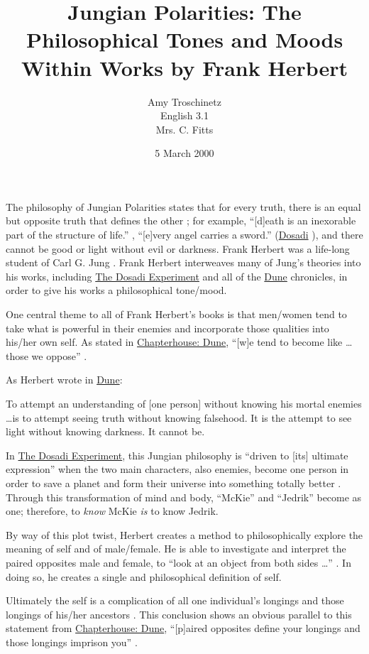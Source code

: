 \documentclass[14pt, a4paper, onecolumn]{extreport}
\date{5 March 2000}
\title{Jungian Polarities: The Philosophical Tones and Moods Within Works by Frank Herbert}
\author{Amy Troschinetz\\
	English 3.1\\
	Mrs. C. Fitts}
\begin{document}
\maketitle

The philosophy of Jungian Polarities states that for every truth, there is an equal but opposite truth that defines the other \cite{Hall:76}; for example, ``[d]eath is an inexorable part of the structure of life.'' \cite{McNelly}, ``[e]very angel carries a sword.'' (\underline{Dosadi} \cite{Dosadi:9}), and there cannot be good or light without evil or darkness. Frank Herbert was a life-long student of Carl G. Jung \cite{McNelly}. Frank Herbert interweaves many of Jung's theories into his works, including \underline{The Dosadi Experiment} and all of the \underline{Dune} chronicles, in order to give his works a philosophical tone/mood.

One central theme to all of Frank Herbert's books is that men/women tend to take what is powerful in their enemies and incorporate those qualities into his/her own self. As stated in \underline{Chapterhouse: Dune}, ``[w]e tend to become like \dots those we oppose'' \cite{Chapterhouse:23}.

As Herbert wrote in \underline{Dune}:

\begin{displayquote}
	To attempt an understanding of [one person] without knowing his mortal enemies \dots is to attempt seeing truth without knowing falsehood. It is the attempt to see light without knowing darkness. It cannot be. \cite{Dune:13}
\end{displayquote}

In \underline{The Dosadi Experiment}, this Jungian philosophy is ``driven to [its] ultimate expression'' when the two main characters, also enemies, become one person in order to save a planet and form their universe into something totally better \cite{Dosadi:270-271}. Through this transformation of mind and body, ``McKie'' and ``Jedrik'' become as one; therefore, to \emph{know} McKie \emph{is} to know Jedrik.

By way of this plot twist, Herbert creates a method to philosophically explore the meaning of self and of male/female. He is able to investigate and interpret the paired opposites male and female, to ``look at an object from both sides \dots'' \cite{Dosadi:272}. In doing so, he creates a single and philosophical definition of self.

Ultimately the self is a complication of all one individual's longings and those longings of his/her ancestors \cite{Berger:56}. This conclusion shows an obvious parallel to this statement from \underline{Chapterhouse: Dune}, ``[p]aired opposites define your longings and those longings imprison you'' \cite{Chapterhouse:431}.
\end{document}
